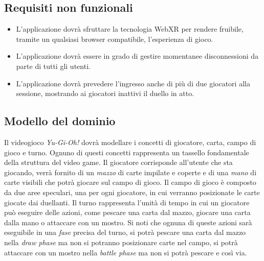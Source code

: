     \subsection{Requisiti non funzionali}\label{subsec:requisitiNonFunzionali}
        \begin{itemize}
            \item L'applicazione dovrà sfruttare la tecnologia WebXR per rendere fruibile, tramite un qualsiasi browser compatibile, l'esperienza di gioco.
            \item L'applicazione dovrà essere in grado di gestire momentanee disconnessioni da parte di tutti gli utenti.
            \item L'applicazione dovrà prevedere l'ingresso anche di più di due giocatori alla sessione, mostrando ai giocatori inattivi il duello in atto.
        \end{itemize}

    \subsection{Modello del dominio}
        Il videogioco \textit{Yu-Gi-Oh!} dovrà modellare i concetti di giocatore, carta, campo di gioco e turno. Ognuno di questi concetti rappresenta un tassello fondamentale
        della struttura del video game. Il giocatore corrisponde all'utente che sta giocando, verrà fornito di un \textit{mazzo} di carte impilate e coperte e di una \textit{mano} di
        carte visibili che potrà giocare sul campo di gioco. Il campo di gioco è composto da due aree speculari, una per ogni giocatore, in cui verranno posizionate le carte giocate
        dai duellanti. Il turno rappresenta l'unità di tempo in cui un giocatore può eseguire delle azioni, come pescare una carta dal mazzo, giocare una carta dalla mano o attaccare
        con un mostro. Si noti che ognuna di queste azioni sarà eseguibile in una \textit{fase} precisa del turno, si potrà pescare una carta dal mazzo nella \textit{draw phase} ma
        non si potranno posizionare carte nel campo, si potrà attaccare con un mostro nella \textit{battle phase} ma non si potrà pescare e così via.\\
    